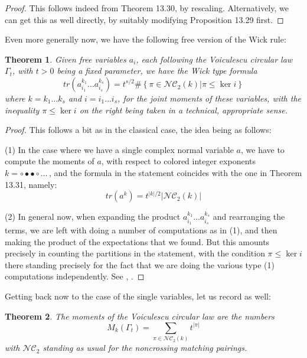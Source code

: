 \documentclass[12pt]{amsbook}
\newtheorem{theorem}{Theorem}[chapter]
\begin{document}
\begin{proof}
This follows indeed from Theorem 13.30, by rescaling. Alternatively, we can get this as well directly, by suitably modifying Proposition 13.29 first.
\end{proof}

Even more generally now, we have the following free version of the Wick rule:


\begin{theorem}
Given free variables $a_i$, each following the Voiculescu circular law $\Gamma_t$, with $t>0$ being a fixed parameter, we have the Wick type formula
$$tr(a_{i_1}^{k_1}\ldots a_{i_s}^{k_s})=t^{s/2}\#\left\{\pi\in\mathcal{NC}_2(k)\Big|\pi\leq\ker i\right\}$$
where $k=k_1\ldots k_s$ and $i=i_1\ldots i_s$, for the joint moments of these variables, with the inequality $\pi\leq\ker i$ on the right being taken in a technical, appropriate sense.
\end{theorem}

\begin{proof}
This follows a bit as in the classical case, the idea being as follows:

\medskip

(1) In the case where we have a single complex normal variable $a$,  we have to compute the moments of $a$, with respect to colored integer exponents $k=\circ\bullet\bullet\circ\ldots\,$, and the formula in the statement coincides with the one in Theorem 13.31, namely:
$$tr(a^k)=t^{|k|/2}|\mathcal{NC}_2(k)|$$

(2) In general now, when expanding the product $a_{i_1}^{k_1}\ldots a_{i_s}^{k_s}$ and rearranging the terms, we are left with doing a number of computations as in (1), and then making the product of the expectations that we found. But this amounts precisely in counting the partitions in the statement, with the condition $\pi\leq\ker i$ there standing precisely for the fact that we are doing the various type (1) computations independently. See \cite{nsp}, \cite{vdn}.
\end{proof}

Getting back now to the case of the single variables, let us record as well:

\begin{theorem}
The moments of the Voiculescu circular law are the numbers
$$M_k(\Gamma_t)=\sum_{\pi\in\mathcal{NC}_2(k)}t^{|\pi|}$$
with $\mathcal{NC}_2$ standing as usual for the noncrossing matching pairings.
\end{theorem}
\end{document}
